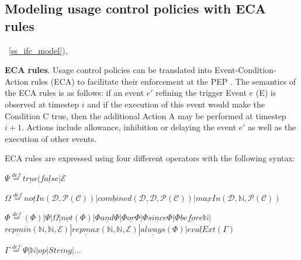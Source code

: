 \subsection{Modeling usage control policies with ECA rules}
\label{ss_usage_control_model}
 \ref{ss_ifc_model}), 

\textbf{ECA rules}. Usage control policies can be translated into Event-Condition-Action rules (ECA) to facilitate their enforcement at the PEP \cite{Kumari2013}. The semantics of the ECA rules is as follows: if an event $e'$ refining the trigger Event $e$ (E) is observed at timestep $i$ and if the execution of this event would make the Condition C true, then the additional Action A may be performed at timestep $i + 1$. Actions include allowance, inhibition or delaying the event $e'$ as well as the execution of other events. 

ECA rules are expressed using four different operators with the following syntax:

\begin{center}
\begin{scriptsize}    
$ \Psi \overset{def}{=} \underline{true} | \underline{false} | \mathcal{E} $

$ \Omega \overset{def}{=} \underline{notIn}(\mathcal{D}, \mathcal{P}(\mathcal{C})) | \underline{combined}(\mathcal{D}, \mathcal{D}, \mathcal{P}(\mathcal{C})) | \underline{maxIn}(\mathcal{D,\mathbb{N},\mathcal{P}(\mathcal{C})}) $

$\Phi \overset{def}{=} (\Phi) | \Psi | \Omega | \underline{not}(\Phi) | \Phi \underline{and} \Phi | \Phi \underline{or} \Phi | \Phi \underline{since} \Phi | \Phi \underline{before} \mathbb{N} |$
$ \underline{repmin}(\mathbb{N}, \mathbb{N}, \mathcal{E}) | \underline{repmax}(\mathbb{N}, \mathbb{N}, \mathcal{E}) | \underline{always}(\Phi) | \underline{evalExt}(\Gamma)$

$\Gamma \overset{def}{=} \Psi | \mathbb{N} | op | String | ...$
\end{scriptsize}
\end{center}

